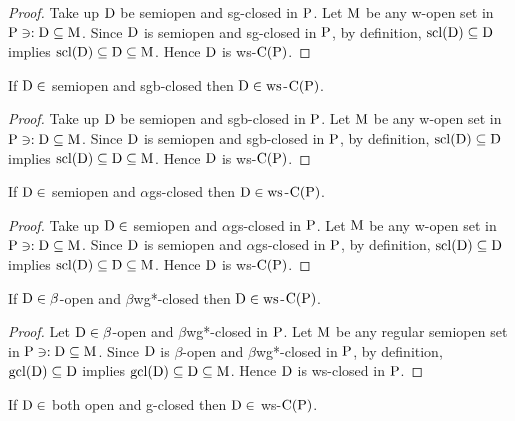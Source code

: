 \begin{proof}
Take up $\mathrm{D}$ be semiopen and sg-closed in $\mathrm{P}$. Let $\mathrm{M}$ be any w-open set in $\mathrm{P} \ni: \mathrm{D}\subseteq \mathrm{M}$. Since $\mathrm{D}$ is semiopen and sg-closed in $\mathrm{P}$, by definition, $\mathrm{scl}(\mathrm{D})\subseteq \mathrm{D}$ implies $\mathrm{scl}(\mathrm{D})\subseteq \mathrm{D}\subseteq \mathrm{M}$. Hence $\mathrm{D}$ is ws-$\mathrm{C}(\mathrm{P})$.
\end{proof}

\begin{thm}\label{thm2.1.18}
If $\mathrm{D}\in$ semiopen and sgb-closed then $\mathrm{D}\in\mathrm{ws}$-$\mathrm{C}(\mathrm{P})$.
\end{thm}

\begin{proof}
Take up $\mathrm{D}$ be semiopen and sgb-closed in $\mathrm{P}$. Let $\mathrm{M}$ be any w-open set in $\mathrm{P} \ni: \mathrm{D}\subseteq \mathrm{M}$. Since $\mathrm{D}$ is semiopen and sgb-closed in $\mathrm{P}$, by definition, $\mathrm{scl}(\mathrm{D})\subseteq \mathrm{D}$ implies $\mathrm{scl}(\mathrm{D})\subseteq \mathrm{D}\subseteq \mathrm{M}$. Hence $\mathrm{D}$ is ws-$\mathrm{C}(\mathrm{P})$.
\end{proof}

\begin{thm}\label{thm2.1.19}
If $\mathrm{D}\in$ semiopen and $\alpha$gs-closed then $\mathrm{D}\in\mathrm{ws}$-$\mathrm{C}(\mathrm{P})$.
\end{thm}

\begin{proof}
Take up $\mathrm{D}\in$ semiopen and $\alpha$gs-closed in $\mathrm{P}$. Let $\mathrm{M}$ be any w-open set in $\mathrm{P}\ni : \mathrm{D}\subseteq \mathrm{M}$. Since $\mathrm{D}$ is semiopen and $\alpha$gs-closed in $\mathrm{P}$, by definition, $\mathrm{scl}(\mathrm{D})\subseteq \mathrm{D}$ implies $\mathrm{scl}(\mathrm{D})\subseteq \mathrm{D}\subseteq \mathrm{M}$. Hence $\mathrm{D}$ is ws-$\mathrm{C}(\mathrm{P})$.
\end{proof}

\begin{thm}\label{thm2.1.20}
If $\mathrm{D}\in\beta$-open and $\beta$wg*-closed then $\mathrm{D}\in\mathrm{ws}$-$\mathrm{C}(\mathrm{P})$.
\end{thm}

\begin{proof}
Let $\mathrm{D}\in\beta$-open and $\beta$wg*-closed in $\mathrm{P}$. Let $\mathrm{M}$ be any regular semiopen set in $\mathrm{P}\ni : \mathrm{D}\subseteq \mathrm{M}$. Since $\mathrm{D}$ is $\beta$-open and $\beta$wg*-closed in $\mathrm{P}$, by definition, $\mathrm{gcl}(\mathrm{D})\subseteq \mathrm{D}$ implies $\mathrm{gcl}(\mathrm{D})\subseteq \mathrm{D}\subseteq \mathrm{M}$. Hence $\mathrm{D}$ is ws-closed in $\mathrm{P}$.
\end{proof}

\begin{thm}\label{thm2.1.21}
If $\mathrm{D}\in$ both open and g-closed then $\mathrm{D}\in$ ws-$\mathrm{C}(\mathrm{P})$.
\end{thm}

